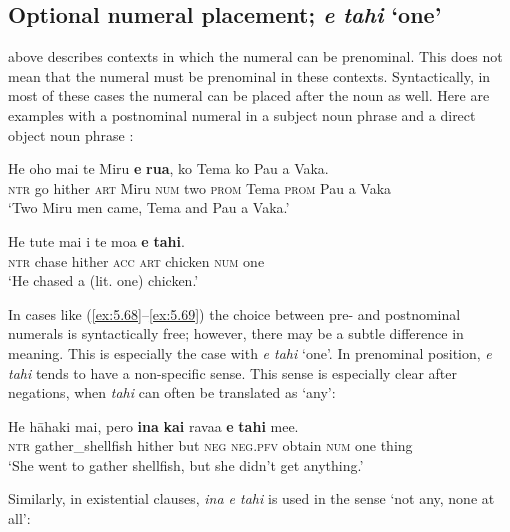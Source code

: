 \subsection{Optional numeral placement; \textit{e tahi} ‘one’}\label{sec:5.4.3}
 above describes contexts in which the numeral can be prenominal. This does not mean that the numeral must be prenominal in these contexts. Syntactically, in most of these cases the numeral can be placed after the noun as well. Here are examples with a postnominal numeral in a subject noun phrase  and a direct object noun phrase :

\ea\label{ex:5.68}
\gll He oho mai te Miru \textbf{e} \textbf{rua}, ko Tema ko Pau {\ꞌ}a Vaka. \\
\textsc{ntr} go hither \textsc{art} Miru \textsc{num} two \textsc{prom} Tema \textsc{prom} Pau a Vaka \\

\glt 
‘Two Miru men came, Tema and Pau a Vaka.’ \textstyleExampleref{[Mtx-3-06.024]}
\z

\ea\label{ex:5.69}
\gll He tute mai i te moa \textbf{e} \textbf{tahi}. \\
\textsc{ntr} chase hither \textsc{acc} \textsc{art} chicken \textsc{num} one \\

\glt
‘He chased a (lit. one) chicken.’ \textstyleExampleref{[Mtx-7-03.033]}
\z

In cases like (\ref{ex:5.68}–\ref{ex:5.69}) the choice between pre- and postnominal numerals is syntactically free; however, there may be a subtle difference in meaning. This is especially the case with \textit{e tahi} ‘one’. In prenominal position, \textit{e tahi} tends to have a non-specific sense. This sense is especially clear after negations, when \textit{tahi} can often be translated as ‘any’:

\ea\label{ex:5.70}
\gll He hāhaki mai, pero \textbf{{\ꞌ}ina} \textbf{kai} rava{\ꞌ}a \textbf{e} \textbf{tahi} me{\ꞌ}e. \\
\textsc{ntr} gather\_shellfish hither but \textsc{neg} \textsc{neg.pfv} obtain \textsc{num} one thing \\

\glt
‘She went to gather shellfish, but she didn’t get anything.’ \textstyleExampleref{[R178.026]} 
\z

Similarly, in existential clauses, \textit{{\ꞌ}ina e tahi} is used in the sense ‘not any, none at all’:

